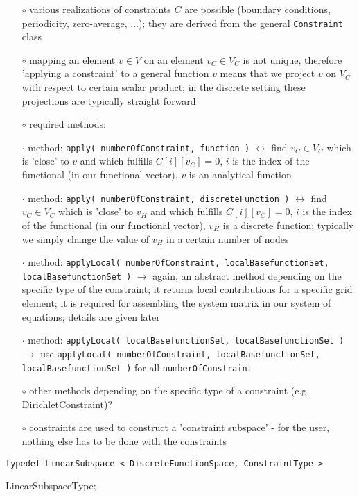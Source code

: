 \documentclass[a4paper,11pt]{article}
\numberwithin{equation}{section}
\begin{document}
\begin{itemize}
\item[$\circ$] various realizations of constraints $C$ are possible (boundary conditions, periodicity, zero-average, ...); they are derived from the general {\tt Constraint} class
\item[$\circ$] mapping an element $v\in V$ on an element $v_C \in V_C$ is not unique, therefore 'applying a constraint' to a general function $v$ means that we project $v$ on $V_C$ with respect to certain scalar product; in the discrete setting these projections are typically straight forward
\item[$\circ$] required methods:
\item[$\cdot$] method: {\tt apply( numberOfConstraint, function )} $\leftrightarrow$ find $v_C \in V_C$ which is 'close' to $v$ and which fulfills $C[i][v_C]=0$, $i$ is the index of the functional (in our functional vector), $v$ is an analytical function
\item[$\cdot$] method: {\tt apply( numberOfConstraint, discreteFunction )} $\leftrightarrow$ find $v_C \in V_C$ which is 'close' to $v_H$ and which fulfills $C[i][v_C]=0$, $i$ is the index of the functional (in our functional vector), $v_H$ is a discrete function; typically we simply change the value of $v_H$ in a certain number of nodes
\item[$\cdot$] method: {\tt applyLocal( numberOfConstraint, localBasefunctionSet, \\ localBasefunctionSet )} $\rightarrow$ again, an abstract method depending on the specific type of the constraint; it returns local contributions for a specific grid element; it is required for assembling the system matrix in our system of equations; details are given later
\item[$\cdot$] method: {\tt applyLocal( localBasefunctionSet, localBasefunctionSet )} $\rightarrow$ use {\tt applyLocal( numberOfConstraint, localBasefunctionSet, \\ localBasefunctionSet )} for all {\tt numberOfConstraint}
\item[$\circ$] other methods depending on the specific type of a constraint (e.g. DirichletConstraint)?
\item[$\circ$] constraints are used to construct a 'constraint subspace' - for the user, nothing else has to be done with the constraints
\end{itemize}
{\tt typedef LinearSubspace < DiscreteFunctionSpace, ConstraintType > 

\hspace{1pt}LinearSubspaceType;}
\end{document}
